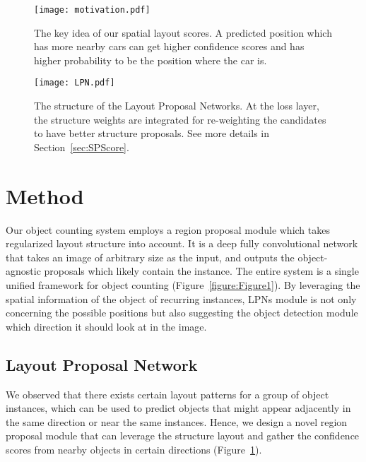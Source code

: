 \documentclass[10pt,twocolumn,letterpaper]{article}
\begin{document}
\begin{figure}[t]
\begin{center}
   \texttt{[image: motivation.pdf]}
\end{center}
   \caption{The key idea of our spatial layout scores. A predicted position which has more nearby cars can get higher confidence scores and has higher probability to be the position where the car is.}
\label{figure:SPScore}
\end{figure}

\begin{figure*}[th]
\begin{center}
   \texttt{[image: LPN.pdf]}
\end{center}
   \caption{The structure of the Layout Proposal Networks.
At the loss layer, the structure weights are integrated for re-weighting the candidates to have better structure proposals. See more details in Section~\ref{sec:SPScore}.}
\label{figure:LPN}
\end{figure*}

\section{Method}

Our object counting system employs a region proposal module which takes regularized layout structure into account. It is a deep fully convolutional network that takes an image of arbitrary size as the input, and outputs the object-agnostic proposals which likely contain the instance. The entire system is a single unified framework for object counting (Figure~\ref{figure:Figure1}). By leveraging the spatial information of the object of recurring instances, LPNs module is not only concerning the possible positions but also suggesting the object detection module which direction it should look at in the image.

\subsection{Layout Proposal Network}

We observed that there exists certain layout patterns for a group of object instances, which can be used to predict objects that might appear adjacently in the same direction or near the same instances. Hence, we design a novel region proposal module that can leverage the structure layout and gather the confidence scores from nearby objects in certain directions (Figure~\ref{figure:SPScore}).
\end{document}
